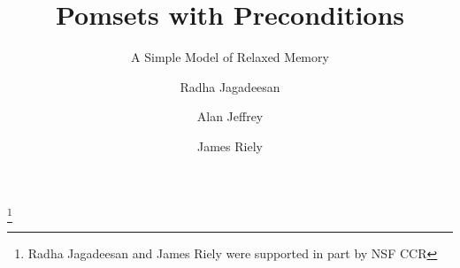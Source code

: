 \documentclass[acmsmall,review,anonymous,screen]{acmart}\settopmatter{printfolios=true}
\theoremstyle{acmdefinition}
\begin{document}
\title{Pomsets with Preconditions}
\subtitle{A Simple Model of Relaxed Memory}





\author{Radha Jagadeesan}

\author{Alan Jeffrey}

\author{James Riely}


\thanks{Radha Jagadeesan and James Riely were supported in part by NSF CCR}
\end{document}
